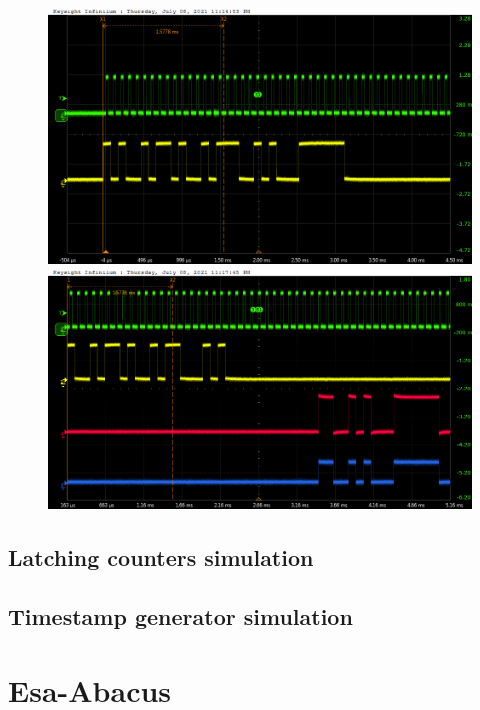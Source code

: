 \begin{figure}[H]
	\centering
	\begin{minipage}{.5\textwidth}
		\centering
		\includegraphics[width=.99\linewidth]{IMG/ch5/probe/09-08-2021_ch05-write63-baselinedac1}
		\caption{}
		\label{fig:ch05write63}
	\end{minipage}%
	\begin{minipage}{.5\textwidth}
		\centering
		\includegraphics[width=.99\linewidth]{IMG/ch5/probe/09-08-2021_ch05-read63-baselinedac1}
		\caption{}
		\label{fig:ch05read63}
	\end{minipage}
\end{figure}

\subsection{Latching counters simulation}

\subsection{Timestamp generator simulation}

\section{Esa-Abacus}
